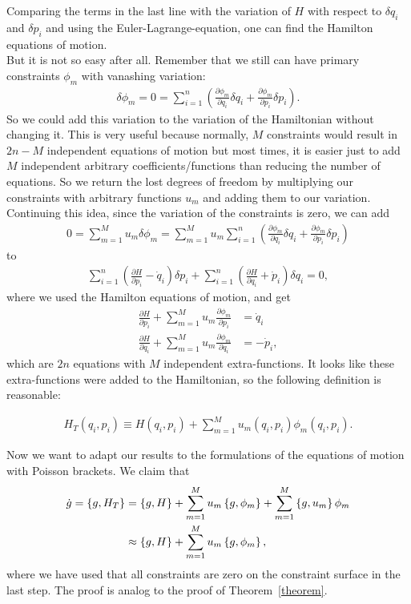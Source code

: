 Comparing the terms in the last line with the variation of $H$ with respect to $\delta q_i$ and $\delta p_i$ and using the Euler-Lagrange-equation, one can find the Hamilton equations of motion. \\
But it is not so easy after all. Remember that we still can have primary constraints $\phi_m$ with vanashing variation:
\begin{align}
\delta \phi_m = 0 = \sum_{i=1}^n \left( \frac{\partial \phi_m}{\partial q_i} \delta q_i + \frac{\partial \phi_m}{\partial p_i} \delta p_i \right).
\end{align}
So we could add this variation to the variation of the Hamiltonian without changing it. This is very useful because normally, $M$ constraints would result in $2n - M$ independent equations of motion but most times, it is easier just to add $M$ independent arbitrary coefficients/functions than reducing the number of equations. So we return the lost degrees of freedom by multiplying our constraints with arbitrary functions $u_m$ and adding them to our variation.
Continuing this idea, since the variation of the constraints is zero, we can add
\begin{align}
0 = \sum_{m=1}^M u_m \delta \phi_m = \sum_{m=1}^M u_m \sum_{i=1}^n \left( \frac{\partial \phi_m}{\partial q_i} \delta q_i + \frac{\partial \phi_m}{\partial p_i} \delta p_i \right)
\end{align}
to 
\begin{align}
\sum_{i=1}^n \left( \frac{\partial H}{\partial p_i} - \dot{q}_i \right) \delta p_i + \sum_{i=1}^n \left( \frac{\partial H}{\partial q_i} + \dot{p}_i \right) \delta q_i = 0,
\end{align}
where we used the Hamilton equations of motion, and get
\begin{align}
\frac{\partial H}{\partial p_i} + \sum_{m=1}^M u_m \frac{\partial \phi_m}{\partial p_i} &= \dot{q}_i \\
\frac{\partial H}{\partial q_i} + \sum_{m=1}^M u_m \frac{\partial \phi_m}{\partial q_i} &= - \dot{p}_i,
\end{align}
which are $2n$ equations with $M$ independent extra-functions. 
It looks like these extra-functions were added to the Hamiltonian, so the following definition is reasonable:
\begin{definition}
\begin{align}
H_T(q_i,p_i) \equiv H(q_i,p_i) + \sum_{m=1}^M u_m(q_i,p_i) \phi_m(q_i,p_i).
\end{align}
\end{definition}
Now we want to adapt our results to the formulations of the equations of motion with Poisson brackets. We claim that
\begin{align}
\dot{g} = \left \{ g,H_T \right \} &= \left \{ g,H \right \} + \sum_{m=1}^M u_m  \left \{ g,\phi_m \right \} + \sum_{m=1}^M \left \{ g,u_m \right \} \phi_m \notag \\
&\approx \left \{ g,H \right \} + \sum_{m=1}^M u_m  \left \{ g,\phi_m \right \},
\end{align}
where we have used that all constraints are zero on the constraint surface in the last step. The proof is analog to the proof of Theorem~\ref{theorem}. \\

